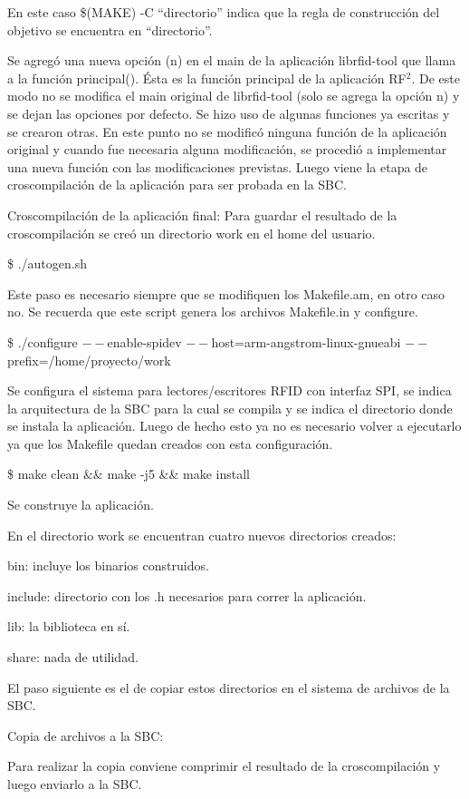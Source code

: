 \bigskip
En este caso \$(MAKE) -C “directorio” indica que la regla de construcción del objetivo se encuentra en “directorio”.

\bigskip
Se agregó una nueva opción (n) en el main de la aplicación librfid-tool que llama a la función principal(). Ésta es la función principal de la aplicación RF$^{2}$. De este modo no se modifica el main original de librfid-tool (solo se agrega la opción n) y se dejan las opciones por defecto.
Se hizo uso de algunas funciones ya escritas y se crearon otras. En este punto no se modificó ninguna función de la aplicación original y cuando fue necesaria alguna modificación, se procedió a implementar una nueva función con las modificaciones previstas.
Luego viene la etapa de croscompilación de la aplicación para ser probada en la SBC.

\bigskip
Croscompilación de la aplicación final:
Para guardar el resultado de la croscompilación se creó un directorio work en el home del usuario.

\bigskip
\centerline{\$ ./autogen.sh}
Este paso es necesario siempre que se modifiquen los Makefile.am, en otro caso no. Se recuerda que este script genera los archivos Makefile.in y configure.

\bigskip
\centerline{\$ ./configure $--$enable-spidev $--$host=arm-angstrom-linux-gnueabi $--$prefix=/home/proyecto/work}

\bigskip
Se configura el sistema para lectores/escritores RFID con interfaz SPI, se indica la arquitectura de la SBC para la cual se compila y se indica el directorio donde se instala la aplicación. Luego de hecho esto ya no es necesario volver a ejecutarlo ya que los Makefile quedan creados con esta configuración.

\centerline{\$ make clean \&\& make -j5 \&\& make install}
Se construye la aplicación.

\bigskip
En el directorio work se encuentran cuatro nuevos directorios creados:

\bigskip
bin: incluye los binarios construidos.

include: directorio con los .h necesarios para correr la aplicación.

lib: la biblioteca en sí.

share: nada de utilidad.

\bigskip
El paso siguiente es el de copiar estos directorios en el sistema de archivos de la SBC.

\bigskip
Copia de archivos a la SBC:

\bigskip
Para realizar la copia conviene comprimir el resultado de la croscompilación y luego enviarlo a la SBC.

